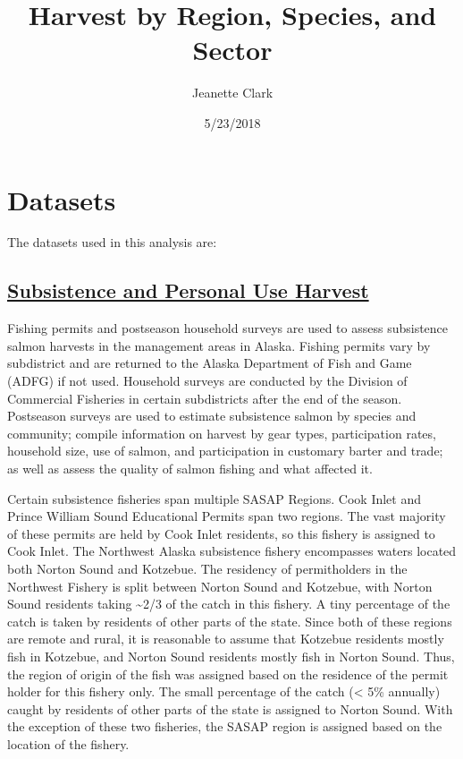 \documentclass[]{article}
\title{Harvest by Region, Species, and Sector}
\author{Jeanette Clark}
\date{5/23/2018}
\begin{document}
\maketitle

\hypertarget{datasets}{%
\section{Datasets}\label{datasets}}

The datasets used in this analysis are:

\hypertarget{subsistence-and-personal-use-harvest}{%
\subsection{\texorpdfstring{\href{https://knb.ecoinformatics.org/\#view/urn:uuid:7e4586c0-9812-4355-8f3b-1445b9a8ca53}{Subsistence
and Personal Use
Harvest}}{Subsistence and Personal Use Harvest}}\label{subsistence-and-personal-use-harvest}}

Fishing permits and postseason household surveys are used to assess
subsistence salmon harvests in the management areas in Alaska. Fishing
permits vary by subdistrict and are returned to the Alaska Department of
Fish and Game (ADFG) if not used. Household surveys are conducted by the
Division of Commercial Fisheries in certain subdistricts after the end
of the season. Postseason surveys are used to estimate subsistence
salmon by species and community; compile information on harvest by gear
types, participation rates, household size, use of salmon, and
participation in customary barter and trade; as well as assess the
quality of salmon fishing and what affected it.

Certain subsistence fisheries span multiple SASAP Regions. Cook Inlet
and Prince William Sound Educational Permits span two regions. The vast
majority of these permits are held by Cook Inlet residents, so this
fishery is assigned to Cook Inlet. The Northwest Alaska subsistence
fishery encompasses waters located both Norton Sound and Kotzebue. The
residency of permitholders in the Northwest Fishery is split between
Norton Sound and Kotzebue, with Norton Sound residents taking
\textasciitilde{}2/3 of the catch in this fishery. A tiny percentage of
the catch is taken by residents of other parts of the state. Since both
of these regions are remote and rural, it is reasonable to assume that
Kotzebue residents mostly fish in Kotzebue, and Norton Sound residents
mostly fish in Norton Sound. Thus, the region of origin of the fish was
assigned based on the residence of the permit holder for this fishery
only. The small percentage of the catch (\textless{} 5\% annually)
caught by residents of other parts of the state is assigned to Norton
Sound. With the exception of these two fisheries, the SASAP region is
assigned based on the location of the fishery.
\end{document}
